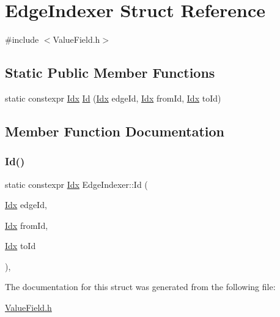 \hypertarget{structEdgeIndexer}{}\section{Edge\+Indexer Struct Reference}
\label{structEdgeIndexer}


{\ttfamily \#include $<$Value\+Field.\+h$>$}

\subsection*{Static Public Member Functions}
\begin{DoxyCompactItemize}
\item 
static constexpr \hyperlink{Includes_8h_ae78891cd308078a2f5f9e7193065c805}{Idx} \hyperlink{structEdgeIndexer_a5da5809ac59751112d34b42dd94da689}{Id} (\hyperlink{Includes_8h_ae78891cd308078a2f5f9e7193065c805}{Idx} edge\+Id, \hyperlink{Includes_8h_ae78891cd308078a2f5f9e7193065c805}{Idx} from\+Id, \hyperlink{Includes_8h_ae78891cd308078a2f5f9e7193065c805}{Idx} to\+Id)
\end{DoxyCompactItemize}


\subsection{Member Function Documentation}
\mbox{\label{structEdgeIndexer_a5da5809ac59751112d34b42dd94da689}} 
\subsubsection{\texorpdfstring{Id()}{Id()}}
{\footnotesize\ttfamily static constexpr \hyperlink{Includes_8h_ae78891cd308078a2f5f9e7193065c805}{Idx} Edge\+Indexer\+::\+Id (\begin{DoxyParamCaption}\item[{\hyperlink{Includes_8h_ae78891cd308078a2f5f9e7193065c805}{Idx}}]{edge\+Id,  }\item[{\hyperlink{Includes_8h_ae78891cd308078a2f5f9e7193065c805}{Idx}}]{from\+Id,  }\item[{\hyperlink{Includes_8h_ae78891cd308078a2f5f9e7193065c805}{Idx}}]{to\+Id }\end{DoxyParamCaption})\hspace{0.3cm}{\ttfamily [inline]}, {\ttfamily [static]}}



The documentation for this struct was generated from the following file\+:\begin{DoxyCompactItemize}
\item 
\hyperlink{ValueField_8h}{Value\+Field.\+h}\end{DoxyCompactItemize}
